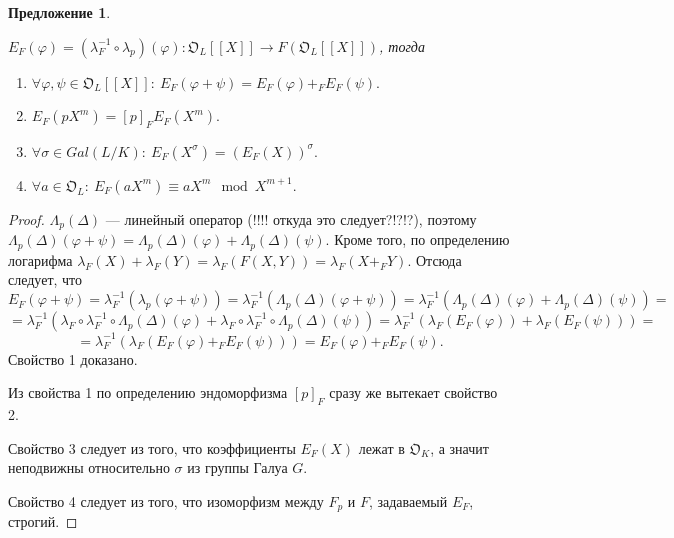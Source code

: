 \documentclass[a4paper]{article}
\newcommand{\OK}{\mathfrak{O}_K}
\newcommand{\OL}{\mathfrak{O}_L}
\newtheorem{proposition}{Предложение}
\begin{document}
\begin{proposition}\
	
	$E_F(\varphi)=(\lambda_F^{-1}\circ\lambda_{p})(\varphi):\OL[[X]]\rightarrow F(\OL[[X]])$, тогда
	
	\begin{enumerate}
		\item $\forall\varphi,\psi\in\OL[[X]]:\ E_F(\varphi+\psi)=E_F(\varphi)+_FE_F(\psi).$
		\item $E_F(pX^m)=[p]_FE_F(X^m).$
		\item $\forall\sigma\in Gal(L/K):\ E_F(X^\sigma)=(E_F(X))^\sigma.$
		\item $\forall a\in\OL:\ E_F(aX^m)\equiv aX^m\mod X^{m+1}.$
	\end{enumerate}
\end{proposition}
\begin{proof}
	$\Lambda_{p}(\Delta)$ --- линейный оператор (!!!! откуда это следует?!?!?), поэтому $\Lambda_{p}(\Delta)(\varphi+\psi)=\Lambda_{p}(\Delta)(\varphi)+\Lambda_{p}(\Delta)(\psi)$. Кроме того, по определению логарифма $\lambda_F(X)+\lambda_F(Y)=\lambda_F(F(X,Y))=\lambda_F(X +_F Y)$. Отсюда следует, что
	$$E_F(\varphi+\psi)=\lambda_F^{-1}(\lambda_p(\varphi+\psi))=\lambda_F^{-1}\left(\Lambda_{p}(\Delta)(\varphi+\psi)\right)=\lambda_F^{-1}\left(\Lambda_{p}(\Delta)(\varphi)+\Lambda_{p}(\Delta)(\psi)\right)=$$
	$$=\lambda_F^{-1}\left(\lambda_F\circ\lambda_F^{-1}\circ\Lambda_{p}(\Delta)(\varphi)+\lambda_F\circ\lambda_F^{-1}\circ\Lambda_{p}(\Delta)(\psi)\right)=\lambda_F^{-1}\left(\lambda_F(E_F(\varphi))+\lambda_F(E_F(\psi))\right)=$$
	$$=\lambda_F^{-1}\left(\lambda_F(E_F(\varphi) +_F E_F(\psi))\right)=E_F(\varphi)+_FE_F(\psi).$$
	Свойство 1 доказано.
	
	Из свойства 1 по определению эндоморфизма $[p]_F$ сразу же вытекает свойство 2.
	
	Свойство 3 следует из того, что коэффициенты $E_F(X)$ лежат в $\OK$, а значит неподвижны относительно $\sigma$ из группы Галуа $G$.
	
	Свойство 4 следует из того, что изоморфизм между $F_p$ и $F$, задаваемый $E_F$, строгий.
\end{proof}


\pagebreak 
\end{document}
